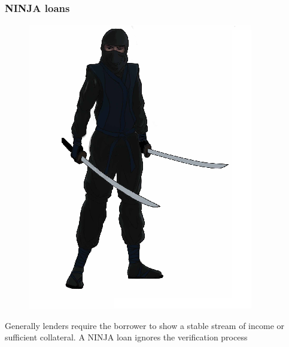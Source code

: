 \documentclass[11pt]{beamer}
\begin{document}
\begin{frame}
\frametitle{NINJA loans}
\begin{figure}
\includegraphics[width=1 \textwidth]{Ninja.png}
\end{figure}
Generally lenders require the borrower to show a stable stream of income or sufficient collateral. A NINJA loan ignores the verification process

\end{frame}
\end{document}
